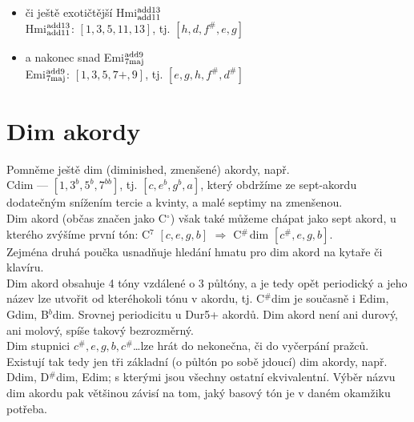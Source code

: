 \documentclass[12pt]{article}
\begin{document}
\begin{itemize}
  \item či ještě exotičtější Hmi${}^{\rm add13}_{\rm add11}$
   \\ Hmi${}^{\rm add13}_{\rm add11}$: $[1,3,5,11,13]$, tj. $[h,d,f^\#,e,g]$
  
  \item a nakonec snad Emi${}^{\rm add9}_{\rm 7maj}$
   \\ Emi${}^{\rm add9}_{\rm 7maj}$: $[1,3,5,7+,9]$, tj. $[e,g,h,f^\#,d^\#]$

\end{itemize}

\section{Dim akordy}
Pomněme ještě dim (diminished, zmenšené) akordy, např.
\\ Cdim --- $[1,3^b,5^b,7^{bb}]$, tj. $[c,e^b,g^b,a]$, který obdržíme ze sept-akordu dodatečným snížením tercie a kvinty, a malé septimy na zmenšenou. 
\\ Dim akord (občas značen jako C${}^\circ$) však také můžeme chápat jako sept akord, u kterého zvýšíme první tón:
C${}^7$ $[c,e,g,b]$ $\Rightarrow$ C$^{\#\,}$dim $[c^\#,e,g,b]$.
\\ Zejména druhá poučka usnadňuje hledání hmatu pro dim akord na kytaře či klavíru.
\\ Dim akord obsahuje 4 tóny vzdálené o 3 půltóny, a je tedy opět periodický a jeho název lze utvořit od kteréhokoli tónu v akordu, tj. C${}^{\#}$dim je současně i Edim, Gdim, B${}^b$dim. Srovnej periodicitu u Dur5+ akordů.
Dim akord není ani durový, ani molový, spíše takový bezrozměrný.
\\ Dim stupnici $c^\#, e, g, b, c^\#$\ldots lze hrát do nekonečna, či do vyčerpání pražců.
\\ Existují tak tedy jen tři základní (o půltón po sobě jdoucí) dim akordy, např. Ddim, D${}^\#$dim, Edim; s kterými jsou všechny ostatní ekvivalentní. Výběr názvu dim akordu pak většinou závisí na tom, jaký basový tón je v daném okamžiku potřeba.


\end{document}
